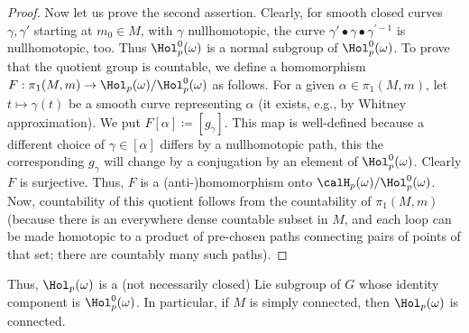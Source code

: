 \begin{proof}
    Now let us prove the second assertion. Clearly, for smooth closed curves $\gamma,\gamma'$ starting at $m_0\in M$, with $\gamma$ nullhomotopic, the curve $\gamma'\bullet\gamma\bullet\gamma^{\prime-1}$ is nullhomotopic, too. Thus $\Hol_p^0(\omega)$ is a normal subgroup of $\Hol_p^0(\omega)$. To prove that the quotient group is countable, we define a homomorphism $F:\pi_1(M,m)\to \Hol_p(\omega)\slash\Hol_p^0(\omega)$ as follows. For a given $\alpha\in\pi_1(M,m)$, let $t\mapsto \gamma(t)$ be a smooth curve representing $\alpha$ (it exists, e.g., by Whitney approximation). We put $F[\alpha]\coloneqq [g_{\gamma}]$. This map is well-defined because a different choice of $\gamma\in [\alpha]$ differs by a nullhomotopic path, this the corresponding $g_\gamma$ will change by a conjugation by an element of $\Hol^0_p(\omega)$. Clearly $F$ is surjective. Thus, $F$ is a (anti-)homomorphism onto $\calH_p(\omega)\slash \Hol^0_p(\omega)$. Now, countability of this quotient follows from the countability of $\pi_1(M,m)$ (because there is an everywhere dense countable subset in $M$, and each loop can be made homotopic to a product of pre-chosen paths connecting pairs of points of that set; there are countably many such paths).
\end{proof}


\begin{rem}
    Thus, $\Hol_p(\omega)$ is a (not necessarily closed) Lie subgroup of $G$ whose identity component is $\Hol_p^0(\omega)$. In particular, if $M$ is simply connected, then $\Hol_p(\omega)$ is connected.
\end{rem}

